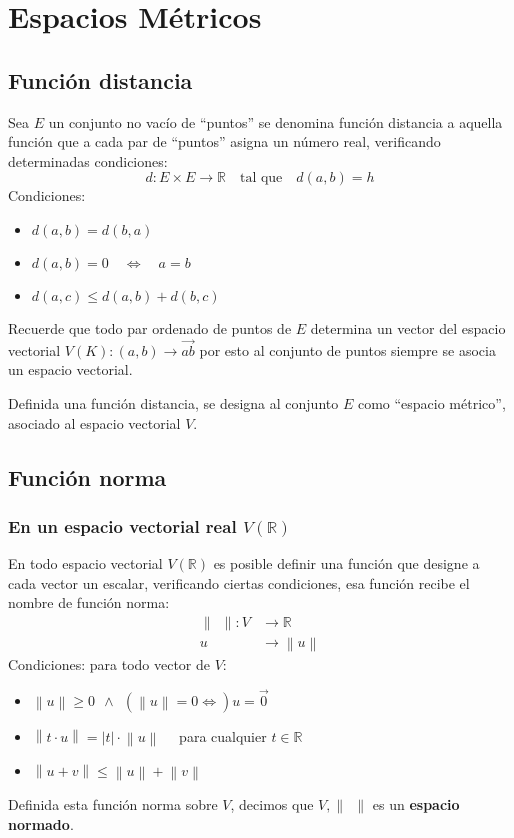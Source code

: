 \section{Espacios Métricos}

\subsection{Función distancia}

Sea \(E\) un conjunto no vacío de ``puntos'' se denomina función distancia a aquella función que a cada par de ``puntos'' asigna un número real, verificando determinadas condiciones:
\[
  d:E\times E \rightarrow \mathbb{R} \quad \text{tal que} \quad d(a,b) = h
\]
Condiciones:
\begin{itemize}
  \item \(d(a,b) = d(b,a)\)
  \item \(d(a,b) = 0 \quad \Longleftrightarrow \quad a=b\)
  \item \(d(a,c) \leq d(a,b) + d(b,c)\)
\end{itemize}
Recuerde que todo par ordenado de puntos de \(E\) determina un vector del espacio vectorial \(V(K):(a,b) \rightarrow \vec{ab}\) por esto al conjunto de puntos siempre se asocia un espacio vectorial.

Definida una función distancia, se designa al conjunto \(E\) como ``espacio métrico'', asociado al espacio vectorial \(V\).

\subsection{Función norma}

\subsubsection{En un espacio vectorial real \(V(\mathbb{R})\)}

En todo espacio vectorial \(V(\mathbb{R})\) es posible definir una función que designe a cada vector un escalar, verificando ciertas condiciones, esa función recibe el nombre de función norma:
\begin{align*}
  \left\lVert ~~ \right\rVert : V &\rightarrow \mathbb{R} \\
  u &\rightarrow \left\lVert u\right\rVert  
\end{align*}
Condiciones: para todo vector de \(V\):
\begin{itemize}
  \item \(\left\lVert u\right\rVert \geq 0 ~~ \land ~~ (\left\lVert u\right\rVert = 0 \Longleftrightarrow) u = \vec{0}\)
  \item \(\left\lVert t \cdot u\right\rVert = \left|t\right| \cdot \left\lVert u\right\rVert \quad\) para cualquier \(t \in \mathbb{R}\)
  \item \(\left\lVert u + v\right\rVert \leq \left\lVert u\right\rVert + \left\lVert v\right\rVert\) 
\end{itemize}
Definida esta función norma sobre \(V\), decimos que \(V, \left\lVert ~~\right\rVert\) es un \textbf{espacio normado}.

